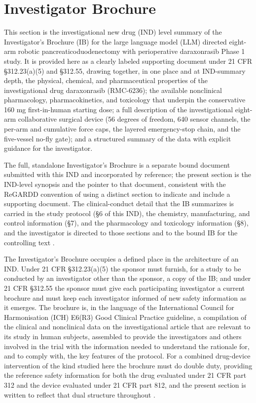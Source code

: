 \section{Investigator Brochure}

This section is the investigational new drug (IND) level summary of the
Investigator's Brochure (IB) for the large language model (LLM) directed eight-arm
robotic pancreaticoduodenectomy with perioperative daraxonrasib Phase 1 study. It is
provided here as a clearly labeled supporting document under 21 CFR
\S 312.23(a)(5) and \S 312.55, drawing together, in one place and at IND-summary
depth, the physical, chemical, and pharmaceutical properties of the
investigational drug daraxonrasib (RMC-6236); the available nonclinical
pharmacology, pharmacokinetics, and toxicology that underpin the conservative
160 mg first-in-human starting dose; a full description of the investigational
eight-arm collaborative surgical device (56 degrees of freedom, 640 sensor
channels, the per-arm and cumulative force caps, the layered emergency-stop chain,
and the five-vessel no-fly gate); and a structured summary of the data with
explicit guidance for the investigator. 

The full, standalone Investigator's
Brochure is a separate bound document submitted with this IND and incorporated by
reference; the present section is the IND-level synopsis and the pointer to that
document, consistent with the ReGARDD convention of using a distinct section to
indicate and include a supporting document. The clinical-conduct detail that the
IB summarizes is carried in the study protocol (\S 6 of this IND), the chemistry,
manufacturing, and control information (\S 7), and the pharmacology and
toxicology information (\S 8), and the investigator is directed to those sections
and to the bound IB for the controlling text \cite{phase1guidance,daraxwhipple}.

The Investigator's Brochure occupies a defined place in the architecture of an
IND. Under 21 CFR \S 312.23(a)(5) the sponsor must furnish, for a study to be
conducted by an investigator other than the sponsor, a copy of the IB; and under
21 CFR \S 312.55 the sponsor must give each participating investigator a current
brochure and must keep each investigator informed of new safety information as it
emerges. The brochure is, in the language of the International Council for
Harmonisation (ICH) E6(R3) Good Clinical Practice guideline, a compilation of the
clinical and nonclinical data on the investigational article that are relevant to
its study in human subjects, assembled to provide the investigators and others
involved in the trial with the information needed to understand the rationale for,
and to comply with, the key features of the protocol. For a combined drug-device
intervention of the kind studied here the brochure must do double duty, providing
the reference safety information for both the drug evaluated under 21 CFR part 312
and the device evaluated under 21 CFR part 812, and the present section is written
to reflect that dual structure throughout \cite{ichpaistduni,cfr312paiuni}.

